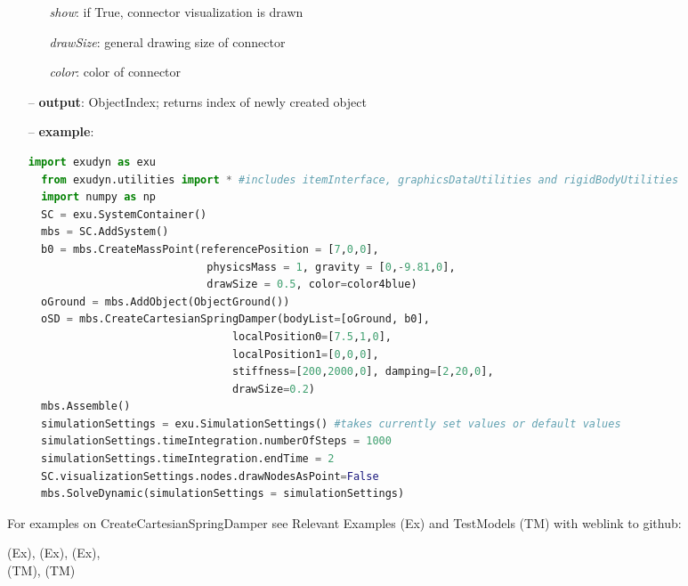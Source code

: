 \begin{itemize}[leftmargin=0.7cm]
\begin{itemize}[leftmargin=1.2cm]
\item[]{\it show}: if True, connector visualization is drawn
\item[]{\it drawSize}: general drawing size of connector
\item[]{\it color}: color of connector
\end{itemize}
\item[--]
{\bf output}: ObjectIndex; returns index of newly created object
\item[--]
{\bf example}: \vspace{-12pt}\ei\begin{lstlisting}[language=Python, xleftmargin=36pt]
  import exudyn as exu
  from exudyn.utilities import * #includes itemInterface, graphicsDataUtilities and rigidBodyUtilities
  import numpy as np
  SC = exu.SystemContainer()
  mbs = SC.AddSystem()
  b0 = mbs.CreateMassPoint(referencePosition = [7,0,0],
                            physicsMass = 1, gravity = [0,-9.81,0],
                            drawSize = 0.5, color=color4blue)
  oGround = mbs.AddObject(ObjectGround())
  oSD = mbs.CreateCartesianSpringDamper(bodyList=[oGround, b0],
                                localPosition0=[7.5,1,0],
                                localPosition1=[0,0,0],
                                stiffness=[200,2000,0], damping=[2,20,0],
                                drawSize=0.2)
  mbs.Assemble()
  simulationSettings = exu.SimulationSettings() #takes currently set values or default values
  simulationSettings.timeIntegration.numberOfSteps = 1000
  simulationSettings.timeIntegration.endTime = 2
  SC.visualizationSettings.nodes.drawNodesAsPoint=False
  mbs.SolveDynamic(simulationSettings = simulationSettings)
\end{lstlisting}\vspace{-24pt}\bi\item[]\vspace{-24pt}\vspace{12pt}\end{itemize}
%

%
\noindent For examples on CreateCartesianSpringDamper see Relevant Examples (Ex) and TestModels (TM) with weblink to github:
\bi
 \item \footnotesize {} (Ex), 
 (Ex), 
 (Ex), 
\\  (TM), 
 (TM)
\ei

